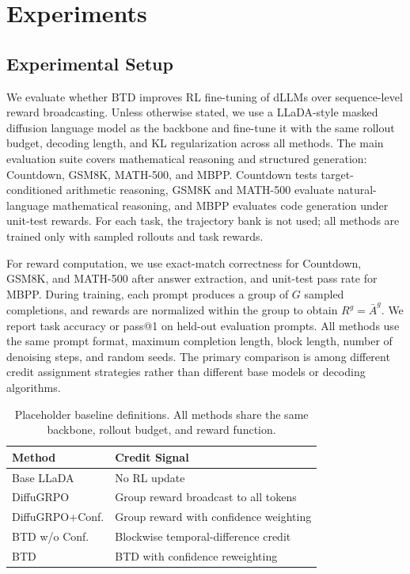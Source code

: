 \documentclass[letterpaper]{article}
\begin{document}
\section{Experiments}
\label{sec:experiments}

\subsection{Experimental Setup}

We evaluate whether BTD improves RL fine-tuning of dLLMs over sequence-level reward broadcasting. Unless otherwise stated, we use a LLaDA-style masked diffusion language model as the backbone and fine-tune it with the same rollout budget, decoding length, and KL regularization across all methods. The main evaluation suite covers mathematical reasoning and structured generation: Countdown, GSM8K, MATH-500, and MBPP. Countdown tests target-conditioned arithmetic reasoning, GSM8K and MATH-500 evaluate natural-language mathematical reasoning, and MBPP evaluates code generation under unit-test rewards. For each task, the trajectory bank is not used; all methods are trained only with sampled rollouts and task rewards.

For reward computation, we use exact-match correctness for Countdown, GSM8K, and MATH-500 after answer extraction, and unit-test pass rate for MBPP. During training, each prompt produces a group of $G$ sampled completions, and rewards are normalized within the group to obtain $R^g=\bar{A}^g$. We report task accuracy or pass@1 on held-out evaluation prompts. All methods use the same prompt format, maximum completion length, block length, number of denoising steps, and random seeds. The primary comparison is among different credit assignment strategies rather than different base models or decoding algorithms.

\begin{table}[t]
\centering
\small
\begin{tabular}{ll}
\hline
Method & Credit Signal \\
\hline
Base LLaDA & No RL update \\
DiffuGRPO & Group reward broadcast to all tokens \\
DiffuGRPO+Conf. & Group reward with confidence weighting \\
BTD w/o Conf. & Blockwise temporal-difference credit \\
BTD & BTD with confidence reweighting \\
\hline
\end{tabular}
\caption{Placeholder baseline definitions. All methods share the same backbone, rollout budget, and reward function.}
\label{tab:baseline_definitions}
\end{table}
\end{document}
